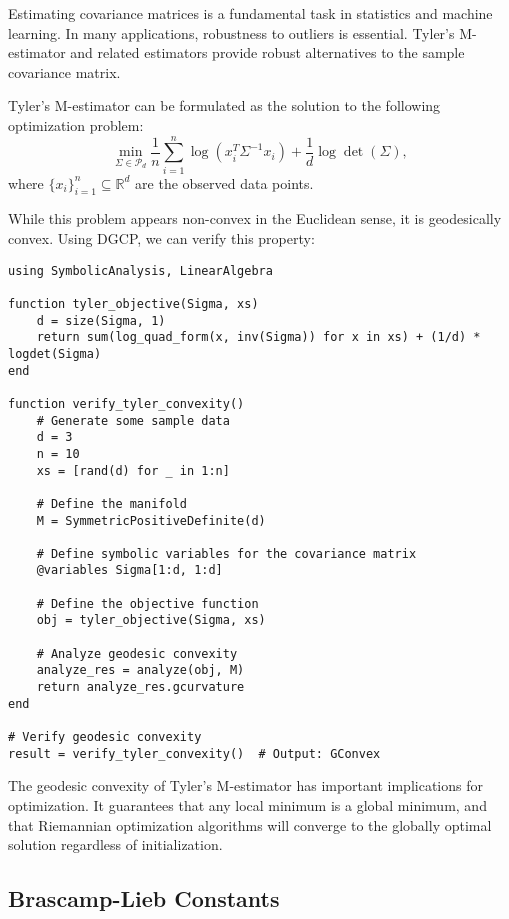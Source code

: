 Estimating covariance matrices is a fundamental task in statistics and machine learning. In many applications, robustness to outliers is essential. Tyler's M-estimator and related estimators provide robust alternatives to the sample covariance matrix.

Tyler's M-estimator can be formulated as the solution to the following optimization problem:
\begin{equation}
\min_{\Sigma \in \mathcal{P}_d} \frac{1}{n} \sum_{i=1}^n \log(x_i^T \Sigma^{-1} x_i) + \frac{1}{d} \log \det(\Sigma),
\end{equation}
where $\{x_i\}_{i=1}^n \subseteq \mathbb{R}^d$ are the observed data points.

While this problem appears non-convex in the Euclidean sense, it is geodesically convex. Using DGCP, we can verify this property:

\begin{verbatim}
using SymbolicAnalysis, LinearAlgebra

function tyler_objective(Sigma, xs)
    d = size(Sigma, 1)
    return sum(log_quad_form(x, inv(Sigma)) for x in xs) + (1/d) * logdet(Sigma)
end

function verify_tyler_convexity()
    # Generate some sample data
    d = 3
    n = 10
    xs = [rand(d) for _ in 1:n]
    
    # Define the manifold
    M = SymmetricPositiveDefinite(d)
    
    # Define symbolic variables for the covariance matrix
    @variables Sigma[1:d, 1:d]
    
    # Define the objective function
    obj = tyler_objective(Sigma, xs)
    
    # Analyze geodesic convexity
    analyze_res = analyze(obj, M)
    return analyze_res.gcurvature
end

# Verify geodesic convexity
result = verify_tyler_convexity()  # Output: GConvex
\end{verbatim}

The geodesic convexity of Tyler's M-estimator has important implications for optimization. It guarantees that any local minimum is a global minimum, and that Riemannian optimization algorithms will converge to the globally optimal solution regardless of initialization.

\subsection{Brascamp-Lieb Constants}

